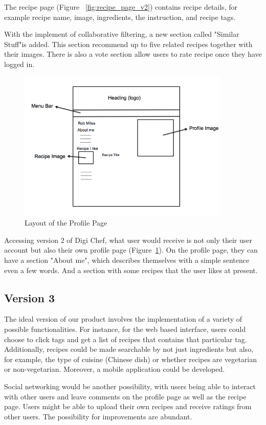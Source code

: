 The recipe page (Figure~ \ref{fig:recipe_page_v2}) contains recipe details, for example recipe name, image, ingredients, the instruction, and recipe tags.
 
 With the implement of collaborative filtering, a new section called "Similar Stuff"is added. This section recommend up to five related recipes together with their images. There is also a vote section allow users to rate recipe once they have logged in.
 
 \begin{figure}[H]
 \begin{center}
\includegraphics[width=0.9\textwidth]{profile_page_v2}
\caption{Layout of the Profile Page}
\label{fig:profile_page_v2}
\end{center}
\end{figure}

Accessing version 2 of Digi Chef, what user would receive is not only their user account but also their own profile page (Figure~\ref{fig:profile_page_v2}). On the profile page, they can have a section "About me", which describes themselves with a simple sentence even a few words. And a section with some recipes that the user likes at present.

\subsection{Version 3}
The ideal version of our product involves the implementation of a variety of possible functionalities. For instance, for the web based interface, users could choose to click tags and get a list of recipes that contains that particular tag. Additionally, recipes could be made searchable by not just ingredients but also, for example, the type of cuisine (Chinese dish) or whether recipes are vegetarian or non-vegetarian. Moreover, a mobile application could be developed. 

Social networking would be another possibility, with users being able to interact with other users and leave comments on the profile page as well as the recipe page. Users might be able to upload their own recipes and receive ratings from other users. The possibility for improvements are abundant.

